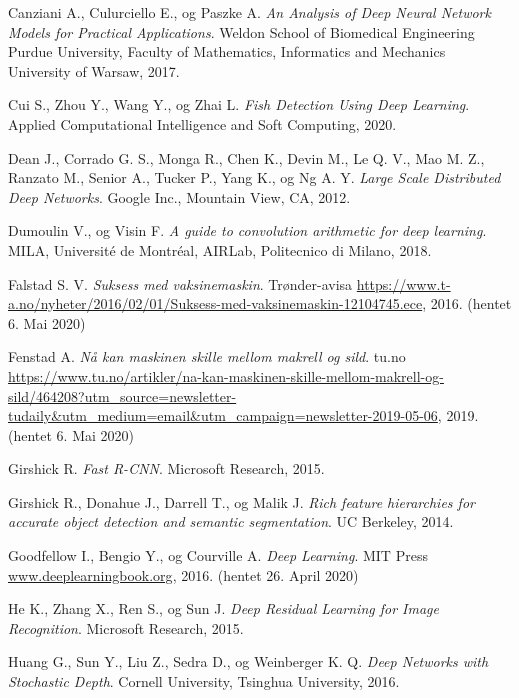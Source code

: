 \documentclass[11ot]{article}
\begin{document}
\begin{thebibliography}{9}
Canziani A., Culurciello E., og Paszke A. 
\textit{An Analysis of Deep Neural Network Models for Practical Applications}. 
Weldon School of Biomedical Engineering Purdue University, Faculty of Mathematics, Informatics and Mechanics University of Warsaw, 2017.

Cui S., Zhou Y., Wang Y., og Zhai L. 
\textit{Fish Detection Using Deep Learning}. 
Applied Computational Intelligence and Soft Computing, 2020.

Dean J., Corrado G. S., Monga R., Chen K., Devin M., Le Q. V., Mao M. Z., Ranzato M., Senior A., Tucker P., Yang K., og Ng A. Y. 
\textit{Large Scale Distributed Deep Networks}. 
Google Inc., Mountain View, CA, 2012.

Dumoulin V., og Visin F. 
\textit{A guide to convolution arithmetic for deep learning}. 
MILA, Université de Montréal, AIRLab, Politecnico di Milano, 2018.

Falstad S. V.
\textit{Suksess med vaksinemaskin}. 
Trønder-avisa \url{https://www.t-a.no/nyheter/2016/02/01/Suksess-med-vaksinemaskin-12104745.ece}, 2016. (hentet 6. Mai 2020)

Fenstad A.
\textit{Nå kan maskinen skille mellom makrell og sild}. 
tu.no \url{https://www.tu.no/artikler/na-kan-maskinen-skille-mellom-makrell-og-sild/464208?utm_source=newsletter-tudaily&utm_medium=email&utm_campaign=newsletter-2019-05-06}, 2019. (hentet 6. Mai 2020)

Girshick R. 
\textit{Fast R-CNN}. 
Microsoft Research, 2015.

Girshick R., Donahue J., Darrell T., og Malik J. 
\textit{Rich feature hierarchies for accurate object detection and semantic segmentation}. 
UC Berkeley, 2014.

Goodfellow I., Bengio Y., og Courville A. 
\textit{Deep Learning}. 
MIT Press \url{www.deeplearningbook.org}, 2016. (hentet 26. April 2020)

He K., Zhang X., Ren S., og Sun J. 
\textit{Deep Residual Learning for Image Recognition}. 
Microsoft Research, 2015.

Huang G., Sun Y., Liu Z., Sedra D., og Weinberger K. Q. 
\textit{Deep Networks with Stochastic Depth}. 
Cornell University, Tsinghua University, 2016.

 

\end{thebibliography}
\end{document}
